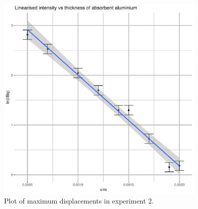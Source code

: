 \documentclass[a4paper,11pt]{article}
\begin{document}
\begin{figure}[H]
\begin{center}
\includegraphics[width=0.9\textwidth,page=2]{Rplots.pdf}
\end{center}
\caption{Plot of maximum displacements in experiment 2.}
\label{fig_exp_plot}
\end{figure}
\end{document}
